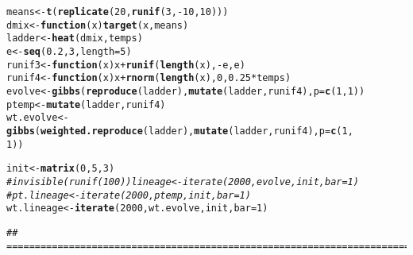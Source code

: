 \documentclass{article}\usepackage[]{graphicx}\usepackage[]{color}
\makeatletter
\newcommand{\hlnum}[1]{\textcolor[rgb]{0.686,0.059,0.569}{#1}}%
\newcommand{\hlcom}[1]{\textcolor[rgb]{0.678,0.584,0.686}{\textit{#1}}}%
\newcommand{\hlopt}[1]{\textcolor[rgb]{0,0,0}{#1}}%
\newcommand{\hlstd}[1]{\textcolor[rgb]{0.345,0.345,0.345}{#1}}%
\newcommand{\hlkwa}[1]{\textcolor[rgb]{0.161,0.373,0.58}{\textbf{#1}}}%
\newcommand{\hlkwb}[1]{\textcolor[rgb]{0.69,0.353,0.396}{#1}}%
\newcommand{\hlkwc}[1]{\textcolor[rgb]{0.333,0.667,0.333}{#1}}%
\newcommand{\hlkwd}[1]{\textcolor[rgb]{0.737,0.353,0.396}{\textbf{#1}}}%
\newenvironment{kframe}{%
 \def\at@end@of@kframe{}%
 \ifinner\ifhmode%
  \def\at@end@of@kframe{\end{minipage}}%
  \begin{minipage}{\columnwidth}%
 \fi\fi%
 \def\FrameCommand##1{\hskip\@totalleftmargin \hskip-\fboxsep
 \colorbox{shadecolor}{##1}\hskip-\fboxsep
     \hskip-\linewidth \hskip-\@totalleftmargin \hskip\columnwidth}%
 \MakeFramed {\advance\hsize-\width
   \@totalleftmargin\z@ \linewidth\hsize
   \@setminipage}}%
 {\par\unskip\endMakeFramed%
 \at@end@of@kframe}
\newenvironment{knitrout}{}{} %
\makeatother
\begin{document}
\begin{knitrout}
\color{fgcolor}\begin{kframe}
\begin{alltt}
\hlstd{means} \hlkwb{<-} \hlkwd{t}\hlstd{(}\hlkwd{replicate}\hlstd{(}\hlnum{20}\hlstd{,} \hlkwd{runif}\hlstd{(}\hlnum{3}\hlstd{,} \hlopt{-}\hlnum{10}\hlstd{,} \hlnum{10}\hlstd{)))}
\hlstd{dmix} \hlkwb{<-} \hlkwa{function}\hlstd{(}\hlkwc{x}\hlstd{)} \hlkwd{target}\hlstd{(x, means)}
\hlstd{ladder} \hlkwb{<-} \hlkwd{heat}\hlstd{(dmix, temps)}
\hlstd{e} \hlkwb{<-} \hlkwd{seq}\hlstd{(}\hlnum{0.2}\hlstd{,} \hlnum{3}\hlstd{,} \hlkwc{length} \hlstd{=} \hlnum{5}\hlstd{)}
\hlstd{runif3} \hlkwb{<-} \hlkwa{function}\hlstd{(}\hlkwc{x}\hlstd{) x} \hlopt{+} \hlkwd{runif}\hlstd{(}\hlkwd{length}\hlstd{(x),} \hlopt{-}\hlstd{e, e)}
\hlstd{runif4} \hlkwb{<-} \hlkwa{function}\hlstd{(}\hlkwc{x}\hlstd{) x} \hlopt{+} \hlkwd{rnorm}\hlstd{(}\hlkwd{length}\hlstd{(x),} \hlnum{0}\hlstd{,} \hlnum{0.25} \hlopt{*} \hlstd{temps)}
\hlstd{evolve} \hlkwb{<-} \hlkwd{gibbs}\hlstd{(}\hlkwd{reproduce}\hlstd{(ladder),} \hlkwd{mutate}\hlstd{(ladder, runif4),} \hlkwc{p} \hlstd{=} \hlkwd{c}\hlstd{(}\hlnum{1}\hlstd{,} \hlnum{1}\hlstd{))}
\hlstd{ptemp} \hlkwb{<-} \hlkwd{mutate}\hlstd{(ladder, runif4)}
\hlstd{wt.evolve} \hlkwb{<-} \hlkwd{gibbs}\hlstd{(}\hlkwd{weighted.reproduce}\hlstd{(ladder),} \hlkwd{mutate}\hlstd{(ladder, runif4),} \hlkwc{p} \hlstd{=} \hlkwd{c}\hlstd{(}\hlnum{1}\hlstd{,}
    \hlnum{1}\hlstd{))}

\hlstd{init} \hlkwb{<-} \hlkwd{matrix}\hlstd{(}\hlnum{0}\hlstd{,} \hlnum{5}\hlstd{,} \hlnum{3}\hlstd{)}
\hlcom{# invisible(runif(100)) lineage <- iterate(2000, evolve, init, bar=1)}
\hlcom{# pt.lineage <- iterate(2000, ptemp, init, bar=1)}
\hlstd{wt.lineage} \hlkwb{<-} \hlkwd{iterate}\hlstd{(}\hlnum{2000}\hlstd{, wt.evolve, init,} \hlkwc{bar} \hlstd{=} \hlnum{1}\hlstd{)}
\end{alltt}
\begin{verbatim}
## ===========================================================================
\end{verbatim}
\end{kframe}
\end{knitrout}
\end{document}
